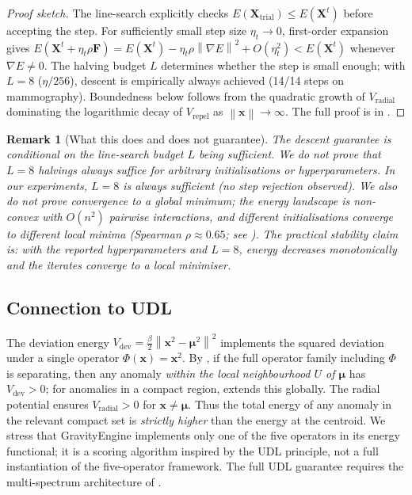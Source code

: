 \documentclass{article}
\newtheorem{remark}[theorem]{Remark}
\newcommand{\norm}[1]{\left\lVert#1\right\rVert}
\begin{document}
\begin{proof}[Proof sketch]
The line-search explicitly checks $E(\mathbf{X}_{\text{trial}}) \leq E(\mathbf{X}^t)$ before accepting the step. For sufficiently small step size $\eta_t \to 0$, first-order expansion gives $E(\mathbf{X}^t + \eta_t \rho \mathbf{F}) = E(\mathbf{X}^t) - \eta_t \rho \norm{\nabla E}^2 + O(\eta_t^2) < E(\mathbf{X}^t)$ whenever $\nabla E \neq 0$. The halving budget $L$ determines whether the step is small enough; with $L=8$ ($\eta/256$), descent is empirically always achieved (14/14 steps on mammography). Boundedness below follows from the quadratic growth of $V_{\text{radial}}$ dominating the logarithmic decay of $V_{\text{repel}}$ as $\norm{\mathbf{x}} \to \infty$. The full proof is in .
\end{proof}

\begin{remark}[What this does and does not guarantee]
\label{rem:convergence_scope}
The descent guarantee is conditional on the line-search budget $L$ being sufficient. We do not prove that $L=8$ halvings always suffice for arbitrary initialisations or hyperparameters. In our experiments, $L=8$ is always sufficient (no step rejection observed). We also do not prove convergence to a \emph{global} minimum; the energy landscape is non-convex with $O(n^2)$ pairwise interactions, and different initialisations converge to different local minima (Spearman $\rho \approx 0.65$; see ). The practical stability claim is: with the reported hyperparameters and $L=8$, energy decreases monotonically and the iterates converge to a local minimiser.
\end{remark}

\subsection{Connection to UDL}

The deviation energy $V_{\text{dev}} = \frac{\beta}{2}\norm{\mathbf{x}^2 - \bm{\mu}^2}^2$ implements the squared deviation under a single operator $\Phi(\mathbf{x}) = \mathbf{x}^2$. By , if the full operator family including $\Phi$ is separating, then any anomaly \emph{within the local neighbourhood $U$ of $\bm{\mu}$} has $V_{\text{dev}} > 0$; for anomalies in a compact region,  extends this globally. The radial potential ensures $V_{\text{radial}} > 0$ for $\mathbf{x} \neq \bm{\mu}$. Thus the total energy of any anomaly in the relevant compact set is \emph{strictly higher} than the energy at the centroid. We stress that GravityEngine implements only one of the five operators in its energy functional; it is a scoring algorithm inspired by the UDL principle, not a full instantiation of the five-operator framework. The full UDL guarantee requires the multi-spectrum architecture of .
\end{document}
